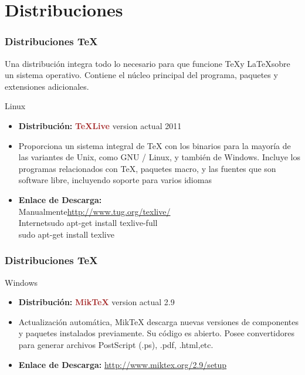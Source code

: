 \documentclass[sans serif,9pt,xcolor=dvipsnames]{beamer}%
\begin{document}
\section{Distribuciones}
\begin{frame}
\frametitle {Distribuciones \TeX}
\justifying
Una distribución integra todo lo necesario para que funcione  \TeX y \LaTeX sobre un sistema operativo. Contiene el núcleo principal del programa, paquetes y extensiones adicionales.

\begin{block}{Linux}
\begin{itemize}
\justifying
\item \textbf{Distribución:} \textcolor{brown}{\textbf{TeXLive}} version actual 2011\\
\item Proporciona un sistema integral de TeX con los binarios para la mayoría de las variantes de Unix, como GNU / Linux, y también de Windows. 
Incluye los programas relacionados con \TeX, paquetes macro, y las fuentes que son software libre, incluyendo soporte para varios idiomas\\
\item \textbf{Enlace de Descarga:}\\
Manualmente\hfill \textcolor{blue}{\url{http://www.tug.org/texlive/}}\\
Internet\hfill sudo apt-get install texlive-full \\
\hfill sudo apt-get install texlive
\end{itemize}
\end{block}
\end{frame}


\begin{frame}
\frametitle{Distribuciones \TeX }

\begin{block}{Windows}
\begin{itemize}
\justifying
\item \textbf{Distribución: } \textcolor{brown}{\textbf{MikTeX}} version actual 2.9
\item Actualización automática, MikTeX descarga nuevas versiones de componentes y paquetes instalados previamente. Su código es abierto.
Posee convertidores para generar archivos PostScript (.ps), .pdf, .html,etc.
\item \textbf{Enlace de Descarga: }\textcolor{blue}{\url{http://www.miktex.org/2.9/setup}}
\end{itemize}
\end{block}
\end{frame}
\end{document}
